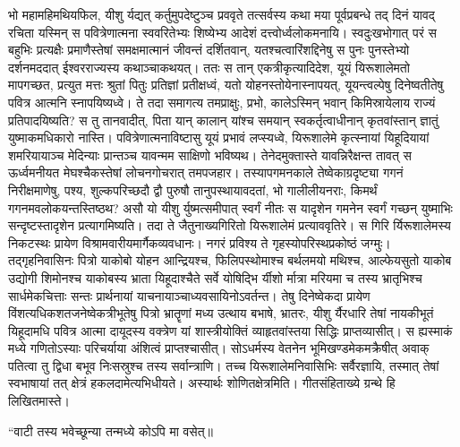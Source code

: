 \adhyAya
{}
\vakya भो महामहिमथियफिल, यीशु र्यद्यत् कर्तुमुपदेष्टुञ्च प्रववृते तत्सर्वस्य कथा मया पूर्वप्रबन्धे तद् दिनं यावद् रचिता
\vakya यस्मिन् स पवित्रेणात्मना स्ववरितेभ्यः शिष्येभ्य आदेशं दत्त्वोर्ध्वलोकमनायि।
\vakya स्वदुःखभोगात् परं स बहुभिः प्रत्यक्षैः प्रमाणैस्तेषां समक्षमात्मानं जीवन्तं दर्शितवान्, यतश्चत्वारिंशद्दिनेषु स पुनः पुनस्तेभ्यो दर्शनमददात् ईश्वरराज्यस्य कथाञ्चाकथयत्।
\vakya ततः स तान् एकत्रीकृत्यादिदेश, यूयं यिरूशालेमतो मापगच्छत, प्रत्युत मत्तः श्रुतां पितुः प्रतिज्ञां प्रतीक्षध्वं,
\vakya यतो योहनस्तोयेनास्नापयत्, यूयन्त्वल्पेषु दिनेष्वतीतेषु पवित्र आत्मनि स्नापयिष्यध्वे।
\vakya ते तदा समागत्य तमप्राक्षुः, प्रभो, कालेऽस्मिन् भवान् किमिस्रायेलाय राज्यं प्रतिपादयिष्यति?
\vakya स तु तानवादीत्, पिता यान् कालान् यांश्च समयान् स्वकर्तृत्वाधीनान् कृतवांस्तान् ज्ञातुं युष्माकमधिकारो नास्ति।
\vakya पवित्रेणात्मनाविष्टासु यूयं प्रभावं लप्स्यध्वे, यिरूशालेमे कृत्स्नायां यिहूदियायां शमरियायाञ्च मेदिन्याः प्रान्तञ्च यावन्मम साक्षिणो भविष्यथ।
\vakya तेनेदमुक्तास्ते यावन्निरैक्षन्त तावत् स ऊर्ध्वमनीयत मेघश्चैकस्तेषां लोचनगोचरात् तमपजहार।
\vakya तस्यापगमनकाले तेष्वेकाग्रदृष्ट्या गगनं निरीक्षमाणेषु, पश्य, शुल्कपरिच्छदौ द्वौ पुरुषौ तानुपस्थायावदतां, भो गालीलीयनराः, किमर्थं गगनमवलोकयन्तस्तिष्ठथ?
\vakya असौ यो यीशु र्युष्मत्समीपात् स्वर्गं नीतः स यादृशेन गमनेन स्वर्गं गच्छन् युष्माभिः सन्दृष्टस्तादृशेन प्रत्यागमिष्यति।
\vakya तदा ते जैतुनाख्यगिरितो यिरूशालेमं प्रत्याववृतिरे। स गिरि र्यिरूशालेमस्य निकटस्थः प्रायेण विश्रामवारीयमार्गैकव्यवधानः।
\vakya नगरं प्रविश्य ते गृहस्योपरिस्थप्रकोष्ठं जग्मुः। तद्गृहनिवासिनः पित्रो याकोबो योहन आन्द्रियश्च, फिलिपस्थोमाश्च बर्थलमयो मथिश्च,
\vakya आल्फेयसुतो याकोब उद्योगी शिमोनश्च याकोबस्य भ्राता यिहूदाश्चैते सर्वे योषिद्भि र्यीशो र्मात्रा मरियमा च तस्य भ्रातृभिश्च सार्धमेकचित्ताः सन्तः प्रार्थनायां याचनायाञ्चाध्यवसायिनोऽवर्तन्त।
\vakya तेषु दिनेष्वेकदा प्रायेण विंशत्यधिकशतजनेष्वेकत्रीभूतेषु पित्रो भ्रातॄणां मध्य उत्थाय बभाषे,
\vakya भ्रातरः, यीशु र्यैरधारि तेषां नायकीभूतं यिहूदामधि पवित्र आत्मा दायूदस्य वक्त्रेण यां शास्त्रीयोक्तिं व्याहृतवांस्तया सिद्धिः प्राप्तव्यासीत्।
\vakya स ह्यस्माकं मध्ये गणितोऽस्याः परिचर्याया अंशित्वं प्राप्तश्चासीत्।
\vakya सोऽधर्मस्य वेतनेन भूमिखण्डमेकमक्रैषीत् अवाक् पतित्वा तु द्विधा बभूव निःसस्रुश्च तस्य सर्वान्त्राणि।
\vakya तच्च यिरूशालेमनिवासिभिः सर्वैरज्ञायि, तस्मात् तेषां स्वभाषायां तत् क्षेत्रं हकलदामेत्यभिधीयते। अस्यार्थः शोणितक्षेत्रमिति। गीतसंहिताख्ये ग्रन्थे हि लिखितमास्ते।
\begin{poem}
\vakya “वाटी तस्य भवेच्छून्या तन्मध्ये कोऽपि मा वसेत्॥
\end{poem}
\eoc